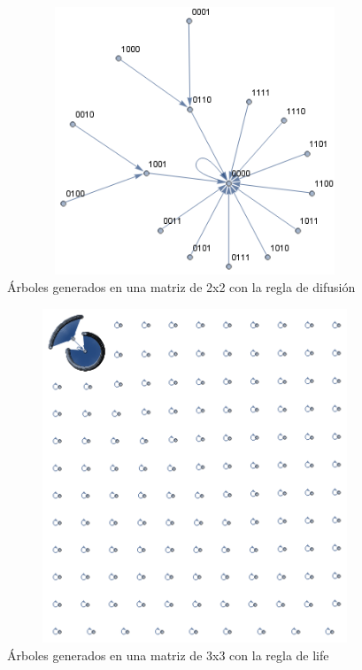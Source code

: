 \begin{figure}[H]
\begin{center}
 \includegraphics[width=12cm, height=8cm]{./img/tam-2-diffusion.png}
 \caption{Árboles generados en una matriz de 2x2 con la regla de difusión}
 \label{fig:difusion2}
\end{center}
\end{figure}

\begin{figure}[H]
\begin{center}
 \includegraphics[width=12cm, height=10cm]{./img/tam-3-life.png}
 \caption{Árboles generados en una matriz de 3x3 con la regla de life}
 \label{fig:vida3}
\end{center}
\end{figure}

